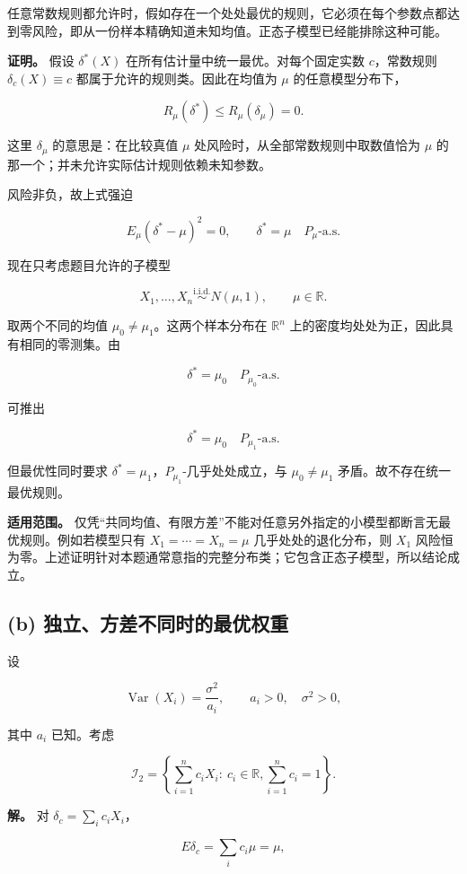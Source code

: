  任意常数规则都允许时，假如存在一个处处最优的规则，它必须在每个参数点都达到零风险，即从一份样本精确知道未知均值。正态子模型已经能排除这种可能。

\textbf{证明。} 假设 $\delta^*(X)$ 在所有估计量中统一最优。对每个固定实数 $c$，常数规则 $\delta_c(X)\equiv c$ 都属于允许的规则类。因此在均值为 $\mu$ 的任意模型分布下，

\[
R_\mu(\delta^*)\le R_\mu(\delta_\mu)=0.
\]

这里 $\delta_\mu$ 的意思是：在比较真值 $\mu$ 处风险时，从全部常数规则中取数值恰为 $\mu$ 的那一个；并未允许实际估计规则依赖未知参数。

风险非负，故上式强迫

\[
E_\mu(\delta^*-\mu)^2=0,
\qquad
\delta^*=\mu\quad P_\mu\text{-a.s.}
\]

现在只考虑题目允许的子模型

\[
X_1,\ldots,X_n\overset{\mathrm{i.i.d.}}{\sim}N(\mu,1),
\qquad \mu\in\mathbb R.
\]

取两个不同的均值 $\mu_0\ne\mu_1$。这两个样本分布在 $\mathbb R^n$ 上的密度均处处为正，因此具有相同的零测集。由

\[
\delta^*=\mu_0\quad P_{\mu_0}\text{-a.s.}
\]

可推出

\[
\delta^*=\mu_0\quad P_{\mu_1}\text{-a.s.}
\]

但最优性同时要求 $\delta^*=\mu_1$，$P_{\mu_1}$-几乎处处成立，与 $\mu_0\ne\mu_1$ 矛盾。故不存在统一最优规则。

\textbf{适用范围。} 仅凭“共同均值、有限方差”不能对任意另外指定的小模型都断言无最优规则。例如若模型只有 $X_1=\cdots=X_n=\mu$ 几乎处处的退化分布，则 $X_1$ 风险恒为零。上述证明针对本题通常意指的完整分布类；它包含正态子模型，所以结论成立。

\subsection{(b) 独立、方差不同时的最优权重}

设

\[
\operatorname{Var}(X_i)=\frac{\sigma^2}{a_i},
\qquad a_i>0,\quad \sigma^2>0,
\]

其中 $a_i$ 已知。考虑

\[
\mathcal I_2=
\left\{\sum_{i=1}^n c_iX_i:\ c_i\in\mathbb R,
\sum_{i=1}^n c_i=1\right\}.
\]

\textbf{解。} 对 $\delta_c=\sum_i c_iX_i$，

\[
E\delta_c=\sum_i c_i\mu=\mu,
\]

